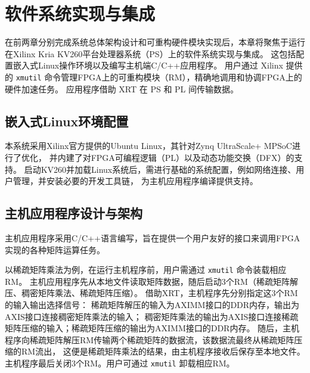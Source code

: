\chapter{软件系统实现与集成}

在前两章分别完成系统总体架构设计和可重构硬件模块实现后，本章将聚焦于运行在Xilinx Kria KV260平台处理器系统（PS）上的软件系统实现与集成。
这包括配置嵌入式Linux操作环境以及编写主机端C/C++应用程序。
用户通过 Xilinx 提供的 \verb|xmutil| 命令管理FPGA上的可重构模块（RM），精确地调用和协调FPGA上的硬件加速任务。
应用程序借助 XRT 在 PS 和 PL 间传输数据。

\section{嵌入式Linux环境配置}

本系统采用Xilinx官方提供的Ubuntu Linux，其针对Zynq UltraScale+ MPSoC进行了优化，
并内建了对FPGA可编程逻辑（PL）以及动态功能交换（DFX）的支持。
启动KV260并加载Linux系统后，需进行基础的系统配置，例如网络连接、用户管理，并安装必要的开发工具链，
为主机应用程序编译提供支持。

\section{主机应用程序设计与架构}

主机应用程序采用C/C++语言编写，旨在提供一个用户友好的接口来调用FPGA实现的各种矩阵运算任务。

以稀疏矩阵乘法为例，在运行主机程序前，用户需通过 \verb|xmutil| 命令装载相应RM。
主机应用程序先从本地文件读取矩阵数据，随后启动3个RM（稀疏矩阵解压、稠密矩阵乘法、稀疏矩阵压缩）。
借助XRT，主机程序先分别指定这3个RM的输入输出选择信号：
稀疏矩阵解压的输入为AXIMM接口的DDR内存，输出为AXIS接口连接稠密矩阵乘法的输入；
稠密矩阵乘法的输出为AXIS接口连接稀疏矩阵压缩的输入；稀疏矩阵压缩的输出为AXIMM接口的DDR内存。
随后，主机程序向稀疏矩阵解压RM传输两个稀疏矩阵的数据流，该数据流最终从稀疏矩阵压缩的RM流出，
这便是稀疏矩阵乘法的结果，由主机程序接收后保存至本地文件。
主机程序最后关闭3个RM。用户可通过 \verb|xmutil| 卸载相应RM。
